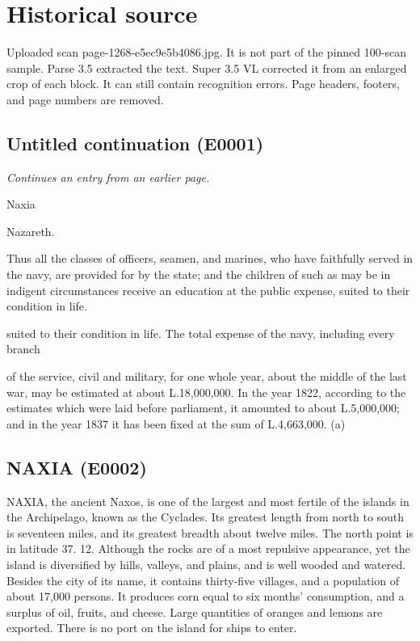 \documentclass{article}
\begin{document}
\section*{Historical source}
Uploaded scan page-1268-e5ec9e5b4086.jpg. It is not part of the pinned 100-scan sample. Parse 3.5 extracted the text. Super 3.5 VL corrected it from an enlarged crop of each block. It can still contain recognition errors.
Page headers, footers, and page numbers are removed.

\subsection*{Untitled continuation (E0001)}
\textit{Continues an entry from an earlier page.}

Naxia

Nazareth.

Thus all the classes of officers, seamen, and marines, who have faithfully served in the navy, are provided for by the state; and the children of such as may be in indigent circumstances receive an education at the public expense, suited to their condition in life.

suited to their condition in life.
The total expense of the navy, including every branch

of the service, civil and military, for one whole year, about the middle of the last war, may be estimated at about L.18,000,000. In the year 1822, according to the estimates which were laid before parliament, it amounted to about L.5,000,000; and in the year 1837 it has been fixed at the sum of L.4,663,000. (a)

\subsection*{NAXIA (E0002)}
NAXIA, the ancient Naxos, is one of the largest and most fertile of the islands in the Archipelago, known as the Cyclades. Its greatest length from north to south is seventeen miles, and its greatest breadth about twelve miles. The north point is in latitude 37. 12. Although the rocks are of a most repulsive appearance, yet the island is diversified by hills, valleys, and plains, and is well wooded and watered. Besides the city of its name, it contains thirty-five villages, and a population of about 17,000 persons. It produces corn equal to six months' consumption, and a surplus of oil, fruits, and cheese. Large quantities of oranges and lemons are exported. There is no port on the island for ships to enter.
\end{document}
